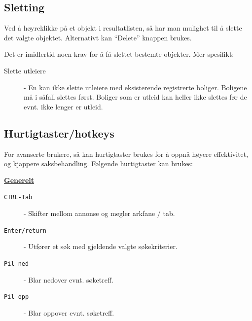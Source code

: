 \subsection{Sletting}
Ved å høyreklikke på et objekt i resultatlisten, så har man mulighet til å slette det valgte objektet.
Alternativt kan “Delete” knappen brukes.

Det er imidlertid noen krav for å få slettet bestemte objekter. Mer spesifikt:

\begin{description}
\item[Slette utleiere] -
En kan ikke slette utleiere med eksisterende registrerte boliger. Boligene må i
såfall slettes først. Boliger som er utleid kan heller ikke slettes før de evnt. ikke lenger er utleid.
\end{description}



\subsection{Hurtigtaster/hotkeys}
For avanserte brukere, så kan hurtigtaster brukes for å oppnå høyere effektivitet, og kjappere
saksbehandling. Følgende hurtigtaster kan brukes:


\textbf{\underline{Generelt}}

\begin{description}
\item[\texttt{CTRL-Tab}] -
Skifter mellom annonse og megler arkfane / tab.
\item[\texttt{Enter/return}] -
Utfører et søk med gjeldende valgte søkekriterier.
\item[\texttt{Pil ned}] -
Blar nedover evnt. søketreff.
\item[\texttt{Pil opp}] -
Blar oppover evnt. søketreff.
\end{description}


